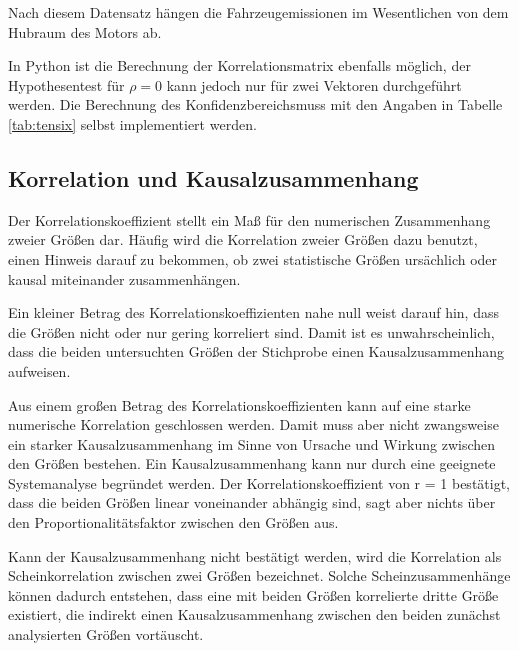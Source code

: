 \noindent Nach diesem Datensatz h\"{a}ngen die Fahrzeugemissionen im Wesentlichen von dem Hubraum des Motors ab.\newline

\clearpage

\noindent In Python ist die Berechnung der Korrelationsmatrix ebenfalls m\"{o}glich, der Hypothesentest f\"{u}r $\rho = 0$ kann jedoch nur f\"{u}r zwei Vektoren durchgef\"{u}hrt werden. Die Berechnung des Konfidenzbereichsmuss mit den Angaben in Tabelle \ref{tab:tensix} selbst implementiert werden.



\clearpage

\subsection{Korrelation und Kausalzusammenhang}

\noindent Der Korrelationskoeffizient stellt ein Ma{\ss} f\"{u}r den numerischen Zusammenhang zweier Gr\"{o}{\ss}en dar. H\"{a}ufig wird die Korrelation zweier Gr\"{o}{\ss}en dazu benutzt, einen Hinweis darauf zu bekommen, ob zwei statistische Gr\"{o}{\ss}en urs\"{a}chlich oder kausal miteinander zusammenh\"{a}ngen.\newline

\noindent Ein kleiner Betrag des Korrelationskoeffizienten nahe null weist darauf hin, dass die Gr\"{o}{\ss}en nicht oder nur gering korreliert sind. Damit ist es unwahrscheinlich, dass die beiden untersuchten Gr\"{o}{\ss}en der Stichprobe einen Kausalzusammenhang aufweisen.\newline

\noindent Aus einem gro{\ss}en Betrag des Korrelationskoeffizienten kann auf eine starke numerische Korrelation geschlossen werden. Damit muss aber nicht zwangsweise ein starker Kausalzusammenhang im Sinne von Ursache und Wirkung zwischen den Gr\"{o}{\ss}en bestehen. Ein Kausalzusammenhang kann nur durch eine geeignete Systemanalyse begr\"{u}ndet werden. Der Korrelationskoeffizient von r = 1 best\"{a}tigt, dass die beiden Gr\"{o}{\ss}en linear voneinander abh\"{a}ngig sind, sagt aber nichts \"{u}ber den Proportionalit\"{a}tsfaktor zwischen den Gr\"{o}{\ss}en aus.\newline

\noindent Kann der Kausalzusammenhang nicht best\"{a}tigt werden, wird die Korrelation als Scheinkorrelation zwischen zwei Gr\"{o}{\ss}en bezeichnet. Solche Scheinzusammenh\"{a}nge k\"{o}nnen dadurch entstehen, dass eine mit beiden Gr\"{o}{\ss}en korrelierte dritte Gr\"{o}{\ss}e existiert, die indirekt einen Kausalzusammenhang zwischen den beiden zun\"{a}chst analysierten Gr\"{o}{\ss}en vort\"{a}uscht.\newline

